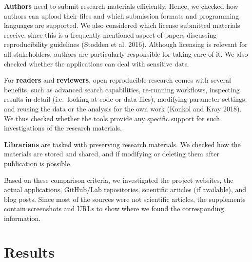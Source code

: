 \documentclass[onecolumn]{article}
\begin{document}
\textbf{Authors} need to submit research materials efficiently. Hence,
we checked how authors can upload their files and which submission
formats and programming languages are supported. We also considered
which license submitted materials receive, since this is a frequently
mentioned aspect of papers discussing reproducibility guidelines
(Stodden et al. 2016). Although licensing is relevant for all
stakeholders, authors are particularly responsible for taking care of
it. We also checked whether the applications can deal with sensitive
data.

For \textbf{readers} and \textbf{reviewers}, open reproducible research
comes with several benefits, such as advanced search capabilities,
re-running workflows, inspecting results in detail (i.e.~looking at code
or data files), modifying parameter settings, and reusing the data or
the analysis for the own work (Konkol and Kray 2018). We thus checked
whether the tools provide any specific support for such investigations
of the research materials.

\textbf{Librarians} are tasked with preserving research materials. We
checked how the materials are stored and shared, and if modifying or
deleting them after publication is possible.

Based on these comparison criteria, we investigated the project
websites, the actual applications, GitHub/Lab repositories, scientific
articles (if available), and blog posts. Since most of the sources were
not scientific articles, the supplements contain screenshots and URLs to
show where we found the corresponding information.

\hypertarget{results}{%
\section{Results}\label{results}}
\end{document}
